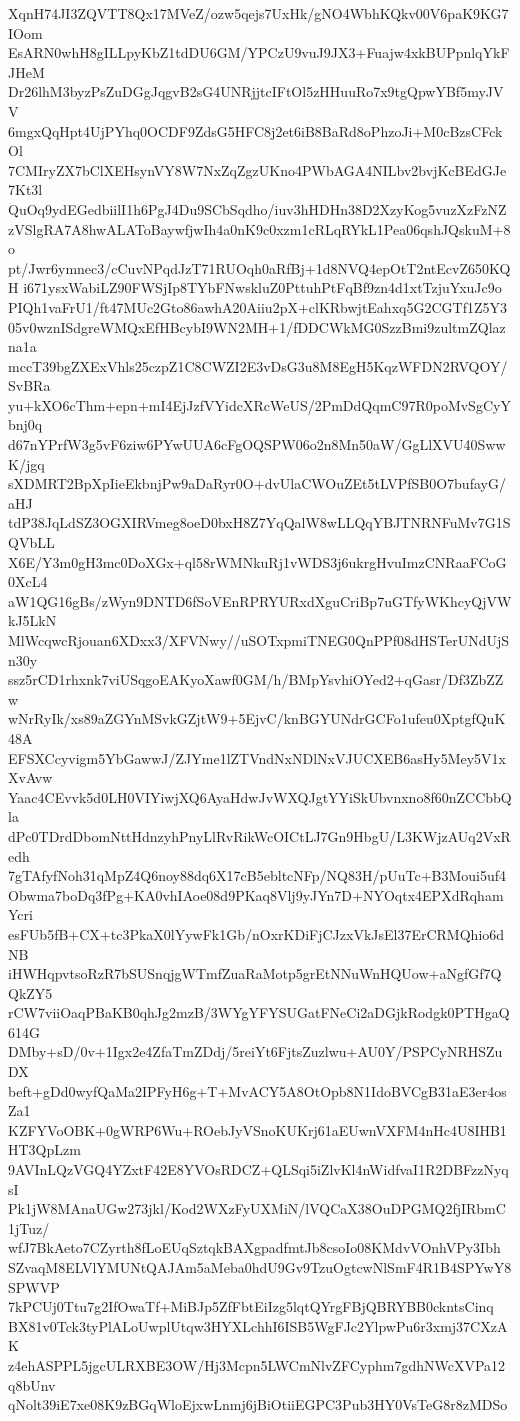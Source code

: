 XqnH74JI3ZQVTT8Qx17MVeZ/ozw5qejs7UxHk/gNO4WbhKQkv00V6paK9KG7IOom
EsARN0whH8gILLpyKbZ1tdDU6GM/YPCzU9vuJ9JX3+Fuajw4xkBUPpnlqYkFJHeM
Dr26lhM3byzPsZuDGgJqgvB2sG4UNRjjtcIFtOl5zHHuuRo7x9tgQpwYBf5myJVV
6mgxQqHpt4UjPYhq0OCDF9ZdsG5HFC8j2et6iB8BaRd8oPhzoJi+M0cBzsCFckOl
7CMIryZX7bClXEHsynVY8W7NxZqZgzUKno4PWbAGA4NILbv2bvjKcBEdGJe7Kt3l
QuOq9ydEGedbiilI1h6PgJ4Du9SCbSqdho/iuv3hHDHn38D2XzyKog5vuzXzFzNZ
zVSlgRA7A8hwALAToBaywfjwIh4a0nK9c0xzm1cRLqRYkL1Pea06qshJQskuM+8o
pt/Jwr6ymnec3/cCuvNPqdJzT71RUOqh0aRfBj+1d8NVQ4epOtT2ntEcvZ650KQH
i671ysxWabiLZ90FWSjIp8TYbFNwskluZ0PttuhPtFqBf9zn4d1xtTzjuYxuJc9o
PIQh1vaFrU1/ft47MUc2Gto86awhA20Aiiu2pX+clKRbwjtEahxq5G2CGTf1Z5Y3
05v0wznISdgreWMQxEfHBcybI9WN2MH+1/fDDCWkMG0SzzBmi9zultmZQlazna1a
mccT39bgZXExVhls25czpZ1C8CWZI2E3vDsG3u8M8EgH5KqzWFDN2RVQOY/SvBRa
yu+kXO6cThm+epn+mI4EjJzfVYidcXRcWeUS/2PmDdQqmC97R0poMvSgCyYbnj0q
d67nYPrfW3g5vF6ziw6PYwUUA6cFgOQSPW06o2n8Mn50aW/GgLlXVU40SwwK/jgq
sXDMRT2BpXpIieEkbnjPw9aDaRyr0O+dvUlaCWOuZEt5tLVPfSB0O7bufayG/aHJ
tdP38JqLdSZ3OGXIRVmeg8oeD0bxH8Z7YqQalW8wLLQqYBJTNRNFuMv7G1SQVbLL
X6E/Y3m0gH3mc0DoXGx+ql58rWMNkuRj1vWDS3j6ukrgHvuImzCNRaaFCoG0XcL4
aW1QG16gBs/zWyn9DNTD6fSoVEnRPRYURxdXguCriBp7uGTfyWKhcyQjVWkJ5LkN
MlWcqwcRjouan6XDxx3/XFVNwy//uSOTxpmiTNEG0QnPPf08dHSTerUNdUjSn30y
ssz5rCD1rhxnk7viUSqgoEAKyoXawf0GM/h/BMpYsvhiOYed2+qGasr/Df3ZbZZw
wNrRyIk/xs89aZGYnMSvkGZjtW9+5EjvC/knBGYUNdrGCFo1ufeu0XptgfQuK48A
EFSXCcyvigm5YbGawwJ/ZJYme1lZTVndNxNDlNxVJUCXEB6asHy5Mey5V1xXvAvw
Yaac4CEvvk5d0LH0VIYiwjXQ6AyaHdwJvWXQJgtYYiSkUbvnxno8f60nZCCbbQla
dPc0TDrdDbomNttHdnzyhPnyLlRvRikWcOICtLJ7Gn9HbgU/L3KWjzAUq2VxRedh
7gTAfyfNoh31qMpZ4Q6noy88dq6X17cB5ebltcNFp/NQ83H/pUuTc+B3Moui5uf4
Obwma7boDq3fPg+KA0vhIAoe08d9PKaq8Vlj9yJYn7D+NYOqtx4EPXdRqhamYcri
esFUb5fB+CX+tc3PkaX0lYywFk1Gb/nOxrKDiFjCJzxVkJsEl37ErCRMQhio6dNB
iHWHqpvtsoRzR7bSUSnqjgWTmfZuaRaMotp5grEtNNuWnHQUow+aNgfGf7QQkZY5
rCW7viiOaqPBaKB0qhJg2mzB/3WYgYFYSUGatFNeCi2aDGjkRodgk0PTHgaQ614G
DMby+sD/0v+1Igx2e4ZfaTmZDdj/5reiYt6FjtsZuzlwu+AU0Y/PSPCyNRHSZuDX
beft+gDd0wyfQaMa2IPFyH6g+T+MvACY5A8OtOpb8N1IdoBVCgB31aE3er4osZa1
KZFYVoOBK+0gWRP6Wu+ROebJyVSnoKUKrj61aEUwnVXFM4nHc4U8IHB1HT3QpLzm
9AVInLQzVGQ4YZxtF42E8YVOsRDCZ+QLSqi5iZlvKl4nWidfvaI1R2DBFzzNyqsI
Pk1jW8MAnaUGw273jkl/Kod2WXzFyUXMiN/lVQCaX38OuDPGMQ2fjIRbmC1jTuz/
wfJ7BkAeto7CZyrth8fLoEUqSztqkBAXgpadfmtJb8csoIo08KMdvVOnhVPy3Ibh
SZvaqM8ELVlYMUNtQAJAm5aMeba0hdU9Gv9TzuOgtcwNlSmF4R1B4SPYwY8SPWVP
7kPCUj0Ttu7g2IfOwaTf+MiBJp5ZfFbtEiIzg5lqtQYrgFBjQBRYBB0ckntsCinq
BX81v0Tck3tyPlALoUwplUtqw3HYXLchhI6ISB5WgFJc2YlpwPu6r3xmj37CXzAK
z4ehASPPL5jgcULRXBE3OW/Hj3Mcpn5LWCmNlvZFCyphm7gdhNWcXVPa12q8bUnv
qNolt39iE7xe08K9zBGqWloEjxwLnmj6jBiOtiiEGPC3Pub3HY0VsTeG8r8zMDSo
